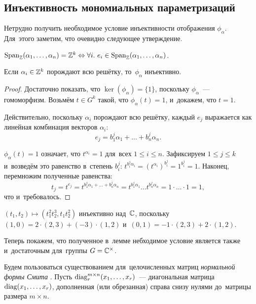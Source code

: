 \subsection{Инъективность мономиальных параметризаций}
Нетрудно получить необходимое условие инъективности отображения $\phi_\alpha$.
Для~этого заметим, что очевидно следующее утверждение.

\begin{statement*}
  $\mathrm{Span}_{\mathbb{Z}}(\alpha_1, \ldots, \alpha_n) = \mathbb{Z}^k \Leftrightarrow \forall i.\ e_i \in \mathrm{Span}_{\mathbb{Z}}(\alpha_1, \ldots, \alpha_n)$.
\end{statement*}

\begin{lemma}
  Если $\alpha_i \in \mathbb{Z}^k$ порождают всю решётку, то~$\phi_\alpha$ инъективно.
\end{lemma}

\begin{proof}
  Достаточно показать, что $\ker(\phi_\alpha) = \{1\}$, поскольку $\phi_\alpha$~— гомоморфизм.
  Возьмём $t \in G^k$ такой, что $\phi_\alpha(t) = 1$, и~докажем, что $t = 1$.

  Действительно, поскольку $\alpha_i$ порождают всю решётку, каждый $e_j$ выражается как линейная комбинация векторов $\alpha_i$:
  \[
    e_j = b^j_1 \alpha_1 + \ldots + b^j_n \alpha_n.
  \]

  $\phi_\alpha(t) = 1$ означает, что $t^{\alpha_i} = 1$ для~всех $1 \leq i \leq n$.
  Зафиксируем $1 \leq j \leq k$ и~возведём это равенство в~степень $b^j_i$: $t^{b^j_i \alpha_i} = (t^{\alpha_i})^{b^j_i} = 1^{b^j_i} = 1$.
  Наконец, перемножим полученные равенства:
  \[
    t_j = t^{e_j} = t^{b^j_1 \alpha_1 + \ldots + b^j_n \alpha_n} = t^{b^j_1 \alpha_1} \ldots t^{b^j_n \alpha_n} = 1 \cdot \ldots \cdot 1 = 1,
  \]
  что и~требовалось.
\end{proof}

\begin{example*}
  $(t_1, t_2) \mapsto (t_1^2 t_2^3, t_1 t_2^2)$ инъективно над~$\mathbb{C}$,
  поскольку $(1, 0) = 2 \cdot (2, 3) + (-3) \cdot (1, 2)$ и~$(0, 1) = -1 \cdot (2, 3) + 2 \cdot (1, 2)$.
\end{example*}

Теперь покажем, что полученное в~лемме небходимое условие является также и~достаточным для~группы $G = \mathbb{C}^\times$.

Будем пользоваться существованием для~целочисленных матриц \textit{нормальной формы Смита} \cite{Smth60}.
Пусть $\mathrm{diag}^{m \times n}_r(x_1, \ldots, x_r)$~— диагональная матрица $\mathrm{diag}(x_1, \ldots, x_r)$,
дополненная (или обрезанная) справа снизу нулями до~матрицы размера $m \times n$.

